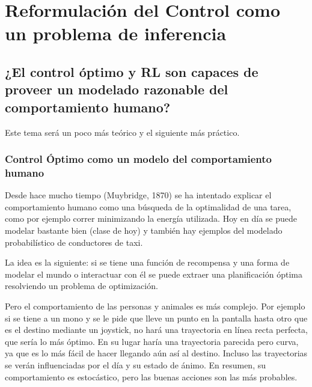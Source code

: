 \chapter{Reformulación del Control como un problema de inferencia}%
\label{cha:reformulación_del_control_como_un_problema_de_inferencia}


\section{¿El control óptimo y RL son capaces de proveer un modelado razonable del
comportamiento humano?}%
\label{sec:_el_control_óptimo_y_rl_son_capaces_de_proveer_un_modelado_razonable_del_comportamiento_humano_}

Este tema será un poco más teórico y el siguiente más práctico.

\subsection{Control Óptimo como un modelo del comportamiento humano}%
\label{sub:control_óptimo_como_un_modelo_del_comportamiento_humano}

Desde hace mucho tiempo (Muybridge, 1870) se ha intentado explicar el comportamiento
humano como una búsqueda de la optimalidad de una tarea, como por ejemplo correr minimizando
la energía utilizada. Hoy en día se puede modelar bastante bien (clase de hoy) y también hay
ejemplos del modelado probabilístico de conductores de taxi.

La idea es la siguiente: si se tiene una función de recompensa y una forma de modelar el mundo
o interactuar con él se puede extraer una planificación óptima resolviendo un problema de
optimización.

Pero el comportamiento de las personas y animales es más complejo. Por ejemplo si se tiene
a un mono y se le pide que lleve un punto en la pantalla hasta otro que es el destino mediante
un joystick, no hará una trayectoria en línea recta perfecta, que sería lo más óptimo. En su
lugar haría una trayectoria parecida pero curva, ya que es lo más fácil de hacer llegando aún
así al destino. Incluso las trayectorias se verán influenciadas por el día y su estado de ánimo.
En resumen, su comportamiento es estocástico, pero las buenas acciones son las más probables.

